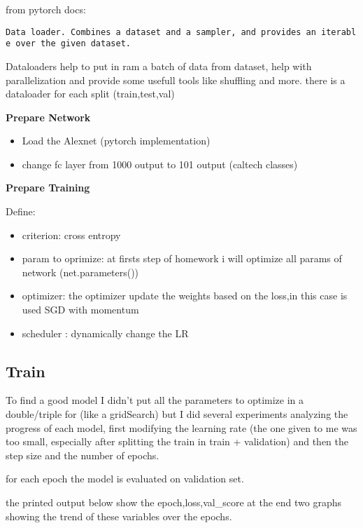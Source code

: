 \documentclass[11pt]{article}
\providecommand{\tightlist}{%
      \setlength{\itemsep}{0pt}\setlength{\parskip}{0pt}}
\begin{document}
    from pytorch docs:

\texttt{Data\ loader.\ Combines\ a\ dataset\ and\ a\ sampler,\ and\ provides\ an\ iterable\ over\ the\ given\ dataset.}

Dataloaders help to put in ram a batch of data from dataset, help with
parallelization and provide some usefull tools like shuffling and more.
there is a dataloader for each split (train,test,val)

    \textbf{Prepare Network}

    \begin{itemize}
\tightlist
\item
  Load the Alexnet (pytorch implementation)
\item
  change fc layer from 1000 output to 101 output (caltech classes)
\end{itemize}

    \textbf{Prepare Training}

    Define:

\begin{itemize}
\tightlist
\item
  criterion: cross entropy
\item
  param to oprimize: at firsts step of homework i will optimize all
  params of network (net.parameters())
\item
  optimizer: the optimizer update the weights based on the loss,in this
  case is used SGD with momentum
\item
  scheduler : dynamically change the LR
\end{itemize}

    \hypertarget{train}{%
\subsection{\texorpdfstring{\textbf{Train}}{Train}}\label{train}}

    To find a good model I didn't put all the parameters to optimize in a
double/triple for (like a gridSearch) but I did several experiments
analyzing the progress of each model, first modifying the learning rate
(the one given to me was too small, especially after splitting the train
in train + validation) and then the step size and the number of epochs.

for each epoch the model is evaluated on validation set.

the printed output below show the epoch,loss,val\_score at the end two
graphs showing the trend of these variables over the epochs.
\end{document}
